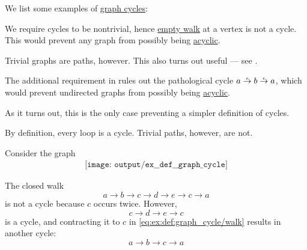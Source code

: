 \begin{example}\label{ex:def:graph_cycle}
  We list some examples of \hyperref[def:graph_cycle]{graph cycles}:
  \begin{thmenum}
     We require cycles to be nontrivial, hence \hyperref[def:graph_walk/empty]{empty walk} at a vertex is not a cycle. This would prevent any graph from possibly being \hyperref[def:acyclic_graph]{acyclic}.

    Trivial graphs are paths, however. This also turns out useful --- see .

     The additional requirement in  rules out the pathological cycle \( a \reloset e \to b \reloset e \to a \), which would prevent undirected graphs from possibly being \hyperref[def:acyclic_graph]{acyclic}.

    As it turns out, this is the only case preventing a simpler definition of cycles.

     By definition, every loop is a cycle. Trivial paths, however, are not.

     Consider the graph
    \begin{equation}\label{eq:ex:def:graph_cycle/eight}
      \begin{aligned}
        \texttt{[image: output/ex\_\_def\_\_graph\_cycle]}
      \end{aligned}
    \end{equation}

    The closed walk
    \begin{equation}\label{eq:ex:def:graph_cycle/walk}
      a \to b \to c \to d \to e \to c \to a
    \end{equation}
    is not a cycle because \( c \) occurs twice. However,
    \begin{equation*}
      c \to d \to e \to c
    \end{equation*}
    is a cycle, and contracting it to \( c \) in \eqref{eq:ex:def:graph_cycle/walk} results in another cycle:
    \begin{equation*}
      a \to b \to c \to a
    \end{equation*}
  \end{thmenum}
\end{example}

